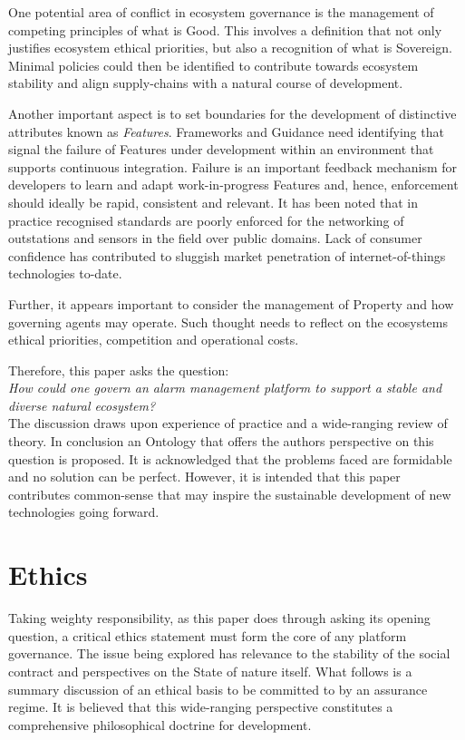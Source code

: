 \documentclass[11pt, oneside]{article}   	%
\begin{document}
One potential area of conflict in ecosystem governance is the management of competing principles of what is Good.
This involves a definition that not only justifies ecosystem ethical priorities, but also a recognition of what is Sovereign.
Minimal policies could then be identified to contribute towards ecosystem stability and align supply-chains with a natural course of development.\

Another important aspect is to set boundaries for the development of distinctive attributes known as \emph{Features}.
Frameworks and Guidance need identifying that signal the failure of Features under development within an environment that supports continuous integration.
Failure is an important feedback mechanism for developers to learn and adapt work-in-progress Features and, hence, enforcement should ideally be rapid, consistent and relevant.
It has been noted that in practice recognised standards are poorly enforced for the networking of outstations and sensors in the field over public domains.
Lack of consumer confidence has contributed to sluggish market penetration of internet-of-things technologies to-date.\

Further, it appears important to consider the management of Property and how governing agents may operate.
Such thought needs to reflect on the ecosystems ethical priorities, competition and operational costs.\

Therefore, this paper asks the question:\\

\emph{How could one govern an alarm management platform to support a stable and diverse natural ecosystem?}\\

The discussion draws upon experience of practice and a wide-ranging review of theory.
In conclusion an Ontology that offers the authors perspective on this question is proposed.
It is acknowledged that the problems faced are formidable and no solution can be perfect.
However, it is intended that this paper contributes common-sense that may inspire the sustainable development of new technologies going forward.\

\pagebreak

\section{Ethics}
Taking weighty responsibility, as this paper does through asking its opening question, a critical ethics statement must form the core of any platform governance.
The issue being explored has relevance to the stability of the social contract and perspectives on the State of nature itself.
What follows is a summary discussion of an ethical basis to be committed to by an assurance regime.
It is believed that this wide-ranging perspective constitutes a comprehensive philosophical doctrine for development.
\end{document}

